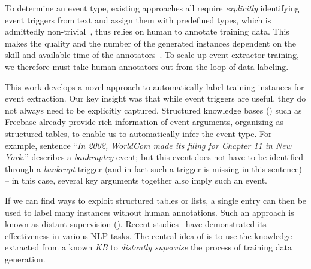 To determine an event type, existing approaches  all require \emph{explicitly} identifying event triggers from text and assign them with predefined types, %
which is admittedly non-trivial~\FIXME{\cite{}}, thus relies on human to annotate training data.
This makes the quality and the number of the generated instances dependent on the skill and available time of the
annotators~\cite{aguilar2014comparison,song2015light}. To scale up event extractor training, we therefore must take human annotators out
from the loop of data labeling.


This work develops a novel approach to automatically label training instances for event extraction. Our key insight was that while event
triggers are useful, they do not always need to be explicitly captured. Structured knowledge bases (\KBs) such as Freebase already provide
rich information of event arguments, organizing as structured tables, to enable us to automatically infer the event type. For example,
sentence ``\textit{In 2002, WorldCom made its filing for Chapter 11 in New York.}'' describes a \emph{bankruptcy} event; but this event
does not have to be identified through a \emph{bankrupt} trigger (and in fact such a trigger is missing in this sentence) -- in this case,
several key arguments together also imply such an event.



If we can find ways to exploit structured tables or lists, a single entry can then be used to label many instances without %
human annotations. Such an approach is known as distant supervision (\DS). Recent
studies~\cite{mintz2009distant,zeng2015distant} have demonstrated its effectiveness in various NLP tasks. The central idea of \DS is to use
the knowledge extracted from a known \textit{KB} to \emph{distantly supervise} the process of training data generation. %


